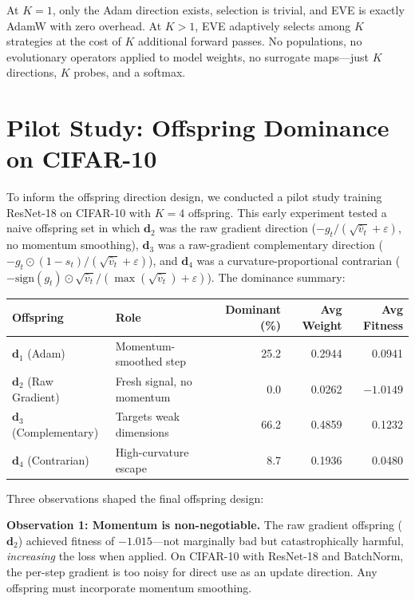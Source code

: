 \documentclass[12pt]{article}
\newcommand{\sign}{\mathrm{sign}}
\begin{document}
At $K = 1$, only the Adam direction exists, selection is trivial, and
EVE is exactly AdamW with zero overhead.
At $K > 1$, EVE adaptively selects among $K$ strategies at the cost
of $K$ additional forward passes.
No populations, no evolutionary operators applied to model weights,
no surrogate maps---just $K$ directions, $K$ probes, and a softmax.


\section{Pilot Study: Offspring Dominance on CIFAR-10}
\label{sec:pilot}

To inform the offspring direction design, we conducted a pilot study
training ResNet-18 on CIFAR-10 with $K = 4$ offspring.
This early experiment tested a naive offspring set in which
$\mathbf{d}_2$ was the raw gradient direction
($-g_t / (\sqrt{\hat{v}_t} + \varepsilon)$, no momentum smoothing),
$\mathbf{d}_3$ was a raw-gradient complementary direction
($-g_t \odot (1 - s_t) / (\sqrt{\hat{v}_t} + \varepsilon)$), and
$\mathbf{d}_4$ was a curvature-proportional contrarian
($-\sign(g_t) \odot \sqrt{\hat{v}_t} / (\max(\sqrt{\hat{v}_t}) +
\varepsilon)$).
The dominance summary:

\begin{center}
\small
\begin{tabular}{@{}llrrr@{}}
  \toprule
  Offspring & Role & Dominant (\%) & Avg Weight & Avg Fitness \\
  \midrule
  $\mathbf{d}_1$ (Adam)          & Momentum-smoothed step     & 25.2 & 0.2944 &  0.0941 \\
  $\mathbf{d}_2$ (Raw Gradient)  & Fresh signal, no momentum  &  0.0 & 0.0262 & $-1.0149$ \\
  $\mathbf{d}_3$ (Complementary) & Targets weak dimensions    & 66.2 & 0.4859 &  0.1232 \\
  $\mathbf{d}_4$ (Contrarian)    & High-curvature escape      &  8.7 & 0.1936 &  0.0480 \\
  \bottomrule
\end{tabular}
\end{center}

Three observations shaped the final offspring design:

\textbf{Observation 1: Momentum is non-negotiable.}
The raw gradient offspring ($\mathbf{d}_2$) achieved fitness of
$-1.015$---not marginally bad but catastrophically harmful,
\emph{increasing} the loss when applied.
On CIFAR-10 with ResNet-18 and BatchNorm, the per-step gradient is
too noisy for direct use as an update direction.
Any offspring must incorporate momentum smoothing.
\end{document}
